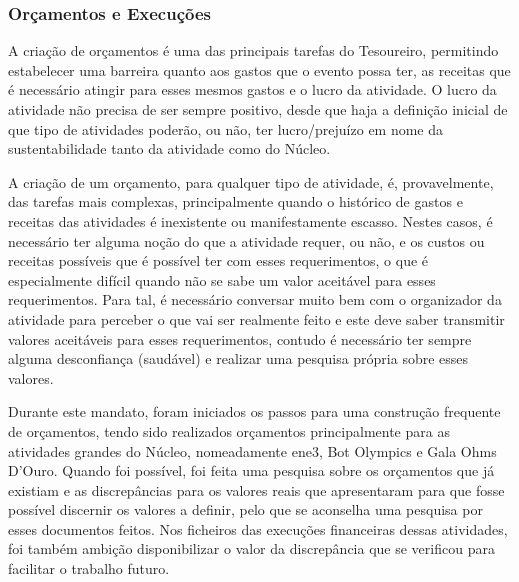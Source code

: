 
\subsubsection{Orçamentos e Execuções}

A criação de orçamentos é uma das principais tarefas do Tesoureiro, permitindo estabelecer uma barreira quanto aos gastos que o evento possa ter, as receitas que é necessário atingir para esses mesmos gastos e o lucro da atividade. O lucro da atividade não precisa de ser sempre positivo, desde que haja a definição inicial de que tipo de atividades poderão, ou não, ter lucro/prejuízo em nome da sustentabilidade tanto da atividade como do Núcleo.

A criação de um orçamento, para qualquer tipo de atividade, é, provavelmente, das tarefas mais complexas, principalmente quando o histórico de gastos e receitas das atividades é inexistente ou manifestamente escasso. Nestes casos, é necessário ter alguma noção do que a atividade requer, ou não, e os custos ou receitas possíveis que é possível ter com esses requerimentos, o que é especialmente difícil quando não se sabe um valor aceitável para esses requerimentos. Para tal, é necessário conversar muito bem com o organizador da atividade para perceber o que vai ser realmente feito e este deve saber transmitir valores aceitáveis para esses requerimentos, contudo é necessário ter sempre alguma desconfiança (saudável) e realizar uma pesquisa própria sobre esses valores.

Durante este mandato, foram iniciados os passos para uma construção frequente de orçamentos, tendo sido realizados orçamentos principalmente para as atividades grandes do Núcleo, nomeadamente \acrshort{ene3}, Bot Olympics e Gala Ohms D'Ouro. Quando foi possível, foi feita uma pesquisa sobre os orçamentos que já existiam e as discrepâncias para os valores reais que apresentaram para que fosse possível discernir os valores a definir, pelo que se aconselha uma pesquisa por esses documentos feitos. Nos ficheiros das execuções financeiras dessas atividades, foi também ambição disponibilizar o valor da discrepância que se verificou para facilitar o trabalho futuro.